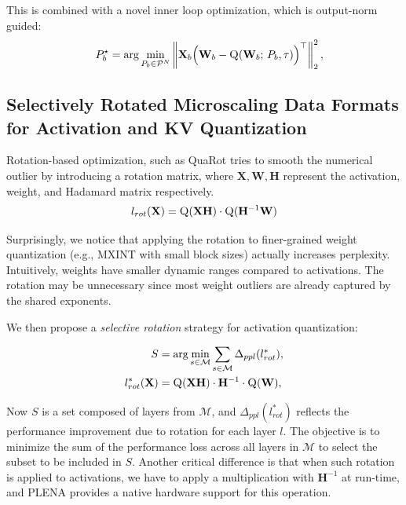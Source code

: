 This is combined with a novel inner loop optimization, which is output-norm guided:
\begin{equation}
\quad P_b^\star
= \arg\min_{P_b\in\mathcal{P}^N}
\left\|
\mathbf{X}_b
\Big(
\mathbf{W}_{b}
-
\textsc{Q}(\mathbf{W}_{b};\,P_b,\tau)
\Big)^\top
\right\|^2_2, 
\end{equation}



\subsection{Selectively Rotated Microscaling Data Formats for Activation and KV Quantization}
\label{subsec:act_quant}

Rotation-based optimization, such as QuaRot\cite{QuaRot} tries to smooth the numerical outlier by introducing a rotation matrix, where $\mathbf{X}, \mathbf{W}, \mathbf{H}$ represent the activation, weight, and Hadamard matrix respectively. 
\begin{equation}
l_{rot}(\mathbf{X}) = \textsc{Q}(\mathbf{X}\mathbf{H}) \cdot \textsc{Q}(\mathbf{H}^{-1}\mathbf{W})
\label{eq:quant_with_rotated_weight}
\end{equation}

Surprisingly, we notice that applying the rotation to finer-grained weight quantization (e.g., MXINT with small block sizes) actually increases perplexity. Intuitively, weights have smaller dynamic ranges compared to activations. The rotation may be unnecessary since most weight outliers are already captured by the shared exponents.

We then propose a \textit{selective rotation} strategy for activation quantization:


\begin{equation}
\begin{aligned}
S &= \arg\min_{s\in\mathcal{M}} \sum_{s\in\mathcal{M}} \Delta_{ppl}(l^*_{rot}), \\
l_{rot}^*(\mathbf{X}) &= \textsc{Q}(\mathbf{X}\mathbf{H}) \cdot \mathbf{H}^{-1} \cdot \textsc{Q}(\mathbf{W}),
\end{aligned}
\label{eq:concise-selective-rotation}
\end{equation}

Now $S$ is a set composed of layers from $\mathcal{M}$, and $\Delta_{ppl}(l_{rot}^*)$ reflects the performance improvement due to rotation for each layer $l$. The objective is to minimize the sum of the performance loss across all layers in $\mathcal{M}$ to select the subset to be included in $S$. Another critical difference is that when such rotation is applied to activations, we have to apply a multiplication with $\mathbf{H}^{-1}$ at run-time, and PLENA provides a native hardware support for this operation. 

